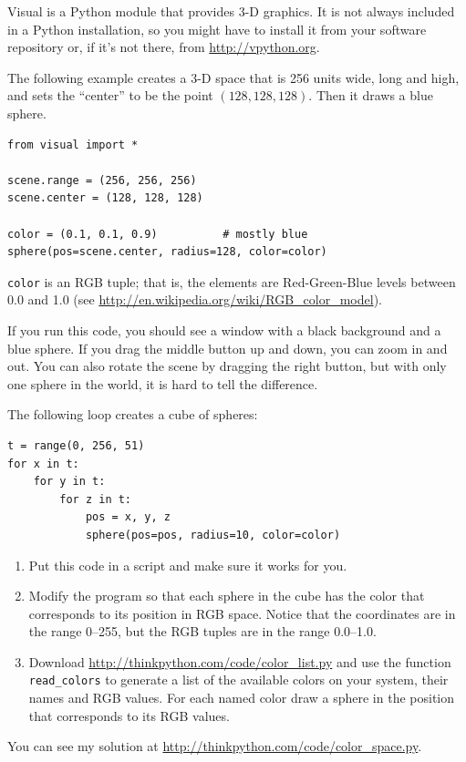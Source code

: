 \documentclass[10pt]{book}
\begin{document}
\begin{exercise}

Visual is a Python module that provides 3-D graphics.  It is
not always included in a Python installation, so you might have
to install it from your software repository or, if it's not there,
from \url{http://vpython.org}.

The following example creates a 3-D space that is 256 units
wide, long and high, and sets the ``center'' to be the
point $(128,128,128)$.  Then it draws a blue sphere.

\begin{verbatim}
from visual import *

scene.range = (256, 256, 256)
scene.center = (128, 128, 128)

color = (0.1, 0.1, 0.9)          # mostly blue
sphere(pos=scene.center, radius=128, color=color)
\end{verbatim}

{\tt color} is an RGB tuple; that is, the elements are Red-Green-Blue
levels between 0.0 and 1.0 (see
\url{http://en.wikipedia.org/wiki/RGB_color_model}).

If you run this code, you should see a window with a black
background and a blue sphere.  If you drag the middle button
up and down, you can zoom in and out.  You can also rotate
the scene by dragging the right button, but with only one
sphere in the world, it is hard to tell the difference.

The following loop creates a cube of spheres:

\begin{verbatim}
t = range(0, 256, 51)
for x in t:
    for y in t:
        for z in t:
            pos = x, y, z
            sphere(pos=pos, radius=10, color=color)
\end{verbatim}

\begin{enumerate}

\item Put this code in a script and make sure it works for
you.

\item Modify the program so that each sphere in the cube
has the color that corresponds to its position in RGB space.
Notice that the coordinates are in the range 0--255, but
the RGB tuples are in the range 0.0--1.0.

\item Download \url{http://thinkpython.com/code/color_list.py}
and use the function \verb"read_colors" to generate a list
of the available colors on your system, their names and
RGB values.  For each named color draw a sphere in the
position that corresponds to its RGB values.



\end{enumerate}

You can see my solution at \url{http://thinkpython.com/code/color_space.py}.

\end{exercise}
\end{document}
